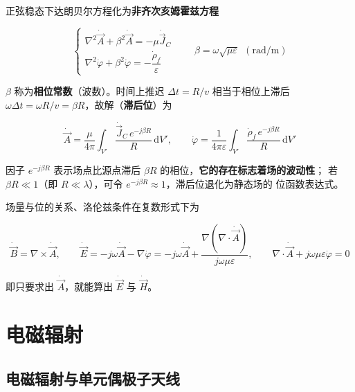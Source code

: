 正弦稳态下达朗贝尔方程化为\textbf{非齐次亥姆霍兹方程}
\begin{formulaBox}
\[
\begin{cases}
\nabla^{2}\dot{\vec{A}}+\beta^{2}\dot{\vec{A}}=-\mu\dot{\vec{J}}_C\\[6pt]
\nabla^{2}\dot{\varphi}+\beta^{2}\dot{\varphi}=-\dfrac{\dot{\rho}_f}{\varepsilon}
\end{cases}
\qquad
\beta=\omega\sqrt{\mu\varepsilon}\ \ (\mathrm{rad/m})
\]
\end{formulaBox}
$\beta$ 称为\textbf{相位常数}（波数）。时间上推迟 $\Delta t=R/v$ 相当于相位上滞后
$\omega\Delta t=\omega R/v=\beta R$，故解（\textbf{滞后位}）为
\begin{formulaBox}
\[
\dot{\vec{A}}=\frac{\mu}{4\pi}\int_{V'}
\frac{\dot{\vec{J}}_C\,e^{-j\beta R}}{R}\,\mathrm{d}V',
\qquad
\dot{\varphi}=\frac{1}{4\pi\varepsilon}\int_{V'}
\frac{\dot{\rho}_f\,e^{-j\beta R}}{R}\,\mathrm{d}V'
\]
\end{formulaBox}
因子 $e^{-j\beta R}$ 表示场点比源点滞后 $\beta R$ 的相位，\textbf{它的存在标志着场的波动性}；
若 $\beta R\ll 1$（即 $R\ll\lambda$），可令 $e^{-j\beta R}\approx1$，滞后位退化为静态场的
位函数表达式。

场量与位的关系、洛伦兹条件在复数形式下为
\begin{formulaBox}
\[
\dot{\vec{B}}=\nabla\times\dot{\vec{A}},
\qquad
\dot{\vec{E}}=-j\omega\dot{\vec{A}}-\nabla\dot{\varphi}
=-j\omega\dot{\vec{A}}+\frac{\nabla(\nabla\cdot\dot{\vec{A}})}{j\omega\mu\varepsilon},
\qquad
\nabla\cdot\dot{\vec{A}}+j\omega\mu\varepsilon\dot{\varphi}=0
\]
\end{formulaBox}
即只要求出 $\dot{\vec{A}}$，就能算出 $\dot{\vec{E}}$ 与 $\dot{\vec{H}}$。


\section{电磁辐射}

\subsection{电磁辐射与单元偶极子天线}

